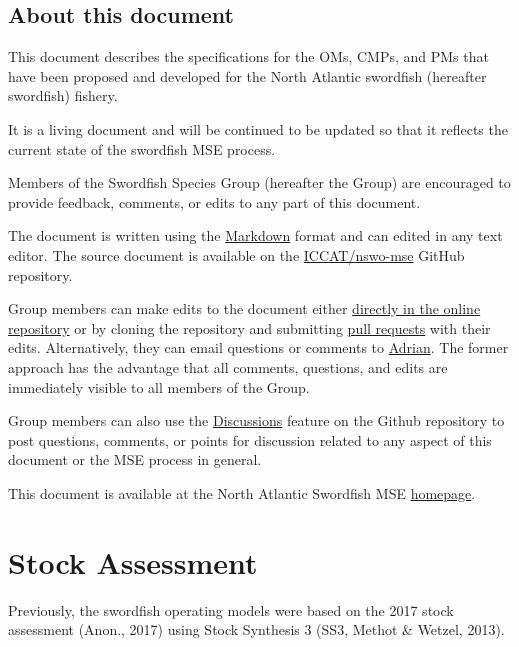 \documentclass[
]{article}
\begin{document}
\hypertarget{about-this-document}{%
\subsection{About this document}\label{about-this-document}}

This document describes the specifications for the OMs, CMPs, and PMs that have been proposed and developed for the North Atlantic swordfish (hereafter swordfish) fishery.

It is a living document and will be continued to be updated so that it reflects the current state of the swordfish MSE process.

Members of the Swordfish Species Group (hereafter the Group) are encouraged to provide feedback, comments, or edits to any part of this document.

The document is written using the \href{https://www.markdownguide.org/}{Markdown} format and can edited in any text editor. The source document is available on the \href{https://github.com/ICCAT/nswo-mse/blob/master/docs/TS/Trial_Specs.Rmd}{ICCAT/nswo-mse} GitHub repository.

Group members can make edits to the document either \href{https://github.com/ICCAT/nswo-mse/edit/master/docs/TS/Trial_Specs.Rmd}{directly in the online repository} or by cloning the repository and submitting \href{https://github.com/ICCAT/nswo-mse/pulls}{pull requests} with their edits. Alternatively, they can email questions or comments to \href{mailto:adrian@bluematterscience.com}{Adrian}. The former approach has the advantage that all comments, questions, and edits are immediately visible to all members of the Group.

Group members can also use the \href{https://github.com/ICCAT/nswo-mse/discussions}{Discussions} feature on the Github repository to post questions, comments, or points for discussion related to any aspect of this document or the MSE process in general.

This document is available at the North Atlantic Swordfish MSE \href{https://iccat.github.io/nswo-mse/}{homepage}.

\hypertarget{stock-assessment}{%
\section{Stock Assessment}\label{stock-assessment}}

Previously, the swordfish operating models were based on the 2017 stock assessment (Anon., 2017) using Stock Synthesis 3 (SS3, Methot \& Wetzel, 2013).
\end{document}

